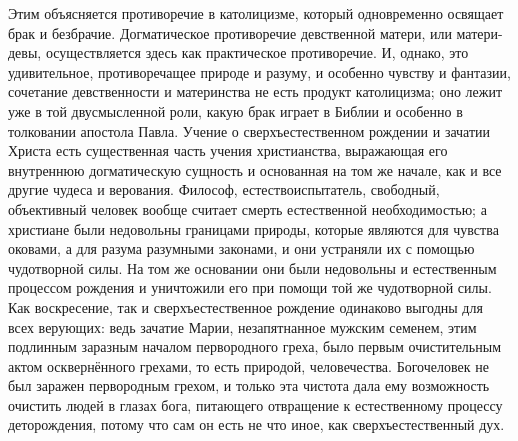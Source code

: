 \documentclass[12pt,oneside]{book}
\begin{document}
Этим объясняется противоречие в католицизме, который одновременно освящает брак и безбрачие. Догматическое противоречие девственной матери, или матери-девы, осуществляется здесь как практическое противоречие. И, однако, это удивительное, противоречащее природе и разуму, и особенно чувству и фантазии, сочетание девственности и материнства не есть продукт католицизма; оно лежит уже в той двусмысленной роли, какую брак играет в Библии и особенно в толковании апостола Павла. Учение о сверхъестественном рождении и зачатии Христа есть существенная часть учения христианства, выражающая его внутреннюю догматическую сущность и основанная на том же начале, как и все другие чудеса и верования. Философ, естествоиспытатель, свободный, объективный человек вообще считает смерть естественной необходимостью; а христиане были недовольны границами природы, которые являются для чувства оковами, а для разума разумными законами, и они устраняли их с помощью чудотворной силы. На том же основании они были недовольны и естественным процессом рождения и уничтожили его при помощи той же чудотворной силы. Как воскресение, так и сверхъестественное рождение одинаково выгодны для всех верующих: ведь зачатие Марии, незапятнанное мужским семенем, этим подлинным заразным началом первородного греха, было первым очистительным актом осквернённого грехами, то есть природой, человечества. Богочеловек не был заражен первородным грехом, и только эта чистота дала ему возможность очистить людей в глазах бога, питающего отвращение к естественному процессу деторождения, потому что сам он есть не что иное, как сверхъестественный дух.
\end{document}
